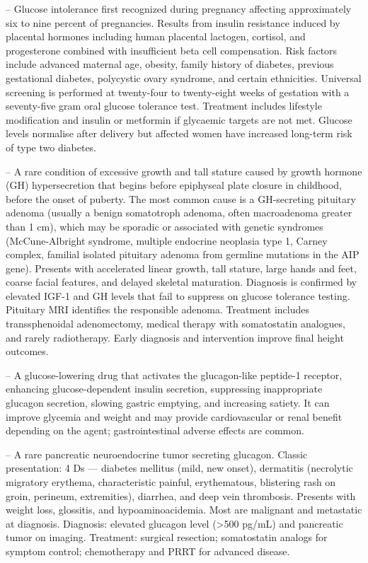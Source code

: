 -- Glucose intolerance first recognized during pregnancy affecting approximately six to nine percent of pregnancies. Results from insulin resistance induced by placental hormones including human placental lactogen, cortisol, and progesterone combined with insufficient beta cell compensation. Risk factors include advanced maternal age, obesity, family history of diabetes, previous gestational diabetes, polycystic ovary syndrome, and certain ethnicities. Universal screening is performed at twenty-four to twenty-eight weeks of gestation with a seventy-five gram oral glucose tolerance test. Treatment includes lifestyle modification and insulin or metformin if glycaemic targets are not met. Glucose levels normalise after delivery but affected women have increased long-term risk of type two diabetes.

-- A rare condition of excessive growth and tall stature caused by growth hormone (GH) hypersecretion that begins before epiphyseal plate closure in childhood, before the onset of puberty. The most common cause is a GH-secreting pituitary adenoma (usually a benign somatotroph adenoma, often macroadenoma greater than 1 cm), which may be sporadic or associated with genetic syndromes (McCune-Albright syndrome, multiple endocrine neoplasia type 1, Carney complex, familial isolated pituitary adenoma from germline mutations in the AIP gene). Presents with accelerated linear growth, tall stature, large hands and feet, coarse facial features, and delayed skeletal maturation. Diagnosis is confirmed by elevated IGF-1 and GH levels that fail to suppress on glucose tolerance testing. Pituitary MRI identifies the responsible adenoma. Treatment includes transsphenoidal adenomectomy, medical therapy with somatostatin analogues, and rarely radiotherapy. Early diagnosis and intervention improve final height outcomes.

-- A glucose-lowering drug that activates the glucagon-like peptide-1 receptor, enhancing glucose-dependent insulin secretion, suppressing inappropriate glucagon secretion, slowing gastric emptying, and increasing satiety. It can improve glycemia and weight and may provide cardiovascular or renal benefit depending on the agent; gastrointestinal adverse effects are common.

-- A rare pancreatic neuroendocrine tumor secreting glucagon. Classic presentation: 4 Ds — diabetes mellitus (mild, new onset), dermatitis (necrolytic migratory erythema, characteristic painful, erythematous, blistering rash on groin, perineum, extremities), diarrhea, and deep vein thrombosis. Presents with weight loss, glossitis, and hypoaminoacidemia. Most are malignant and metastatic at diagnosis. Diagnosis: elevated glucagon level (>500 pg/mL) and pancreatic tumor on imaging. Treatment: surgical resection; somatostatin analogs for symptom control; chemotherapy and PRRT for advanced disease.

